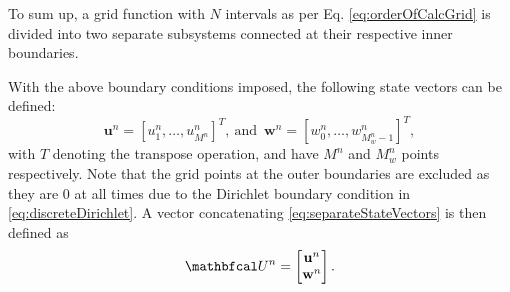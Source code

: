 To sum up, a grid function with $N$ intervals as per Eq. \eqref{eq:orderOfCalcGrid} is divided into two separate subsystems connected at their respective inner boundaries. %

With the above boundary conditions imposed, the following state vectors can be defined:
\begin{equation}
    \label{eq:separateStateVectors}
     \mathbf{u}^n = [u_1^n, \hdots, u_{M^n}^n]^T\!, \  \text{and} \ \; \mathbf{w}^n = [w_0^n, \hdots, w_{M_w^n-1}^n]^T,
\end{equation}
with $T$ denoting the transpose operation, and have $M^n$ and $M_{w}^n$ points respectively. Note that the grid points at the outer boundaries are excluded as they are 0 at all times due to the Dirichlet boundary condition in \eqref{eq:discreteDirichlet}. A vector concatenating \eqref{eq:separateStateVectors} is then defined as 
\begin{equation}\label{eq:fullState}
    \U^n = \begin{bmatrix}
        \mathbf{u}^n \\
        \mathbf{w}^n
    \end{bmatrix}.
\end{equation}

